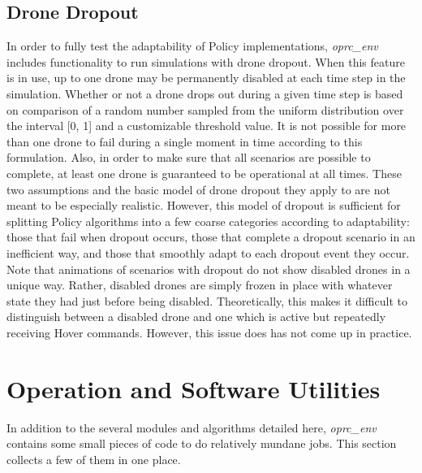 \subsection{Drone Dropout}

In order to fully test the adaptability of Policy implementations, \textit{oprc\_env} includes functionality to run simulations with drone dropout. When this feature is in use, up to one drone may be permanently disabled at each time step in the simulation. Whether or not a drone drops out during a given time step is based on comparison of a random number sampled from the uniform distribution over the interval [0, 1] and a customizable threshold value. It is not possible for more than one drone to fail during a single moment in time according to this formulation. Also, in order to make sure that all scenarios are possible to complete, at least one drone is guaranteed to be operational at all times. These two assumptions and the basic model of drone dropout they apply to are not meant to be especially realistic. However, this model of dropout is sufficient for splitting Policy algorithms into a few coarse categories according to adaptability: those that fail when dropout occurs, those that complete a dropout scenario in an inefficient way, and those that smoothly adapt to each dropout event they occur. Note that animations of scenarios with dropout do not show disabled drones in a unique way. Rather, disabled drones are simply frozen in place with whatever state they had just before being disabled. Theoretically, this makes it difficult to distinguish between a disabled drone and one which is active but repeatedly receiving Hover commands. However, this issue does has not come up in practice.


\section{Operation and Software Utilities}

In addition to the several modules and algorithms detailed here, \textit{oprc\_env} contains some small pieces of code to do relatively mundane jobs. This section collects a few of them in one place.

